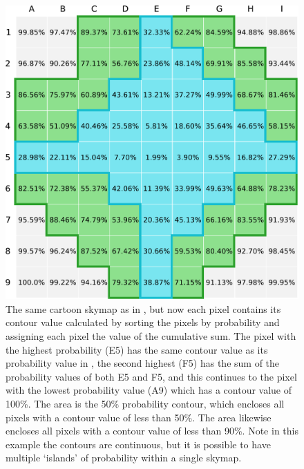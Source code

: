 \begin{colsection}
\clearpage

\begin{figure}[t]
    \begin{center}
        \includegraphics[width=0.95\linewidth]{images/sim/sim_skymap_conts.pdf}
    \end{center}
    \caption[An example 2D skymap with pixel contour values]{
        The same cartoon skymap as in , but now each pixel contains its contour value calculated by sorting the pixels by probability and assigning each pixel the value of the cumulative sum. The pixel with the highest probability (E5) has the same contour value as its probability value in , the second highest (F5) has the sum of the probability values of both E5 and F5, and this continues to the pixel with the lowest probability value (A9) which has a contour value of 100\%. The  area is the 50\% probability contour, which encloses all pixels with a contour value of less than 50\%. The  area likewise encloses all pixels with a contour value of less than 90\%. Note in this example the contours are continuous, but it is possible to have multiple `islands' of probability within a single skymap.
    }\label{fig:sim_skymap_conts}
\end{figure}

\clearpage

\makeatletter
\setlength{\@fptop}{0\p@ \@plus 1fil} %
\makeatother

\newpage

\end{colsection}


